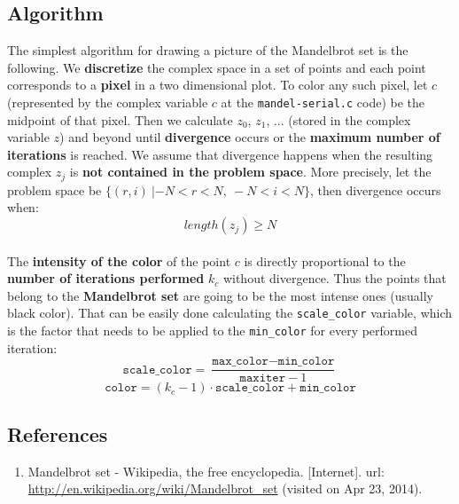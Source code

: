 \documentclass[a4paper,11pt]{article}
\begin{document}
\subsection{Algorithm}
The simplest algorithm for drawing a picture of the Mandelbrot set is the following. We \textbf{discretize} the
    complex space in a set of points and each point corresponds to a \textbf{pixel} in a two dimensional plot. To color
    any such pixel, let $c$ (represented by the complex variable $c$ at the \texttt{mandel-serial.c}
    code) be the midpoint of that pixel. Then we calculate $z_0$, $z_1$, ... (stored in the complex variable
    $z$) and beyond until \textbf{divergence} occurs or
    the \textbf{maximum number of iterations} is reached. We assume that divergence happens when the resulting complex
    $z_j$ is \textbf{not contained in the problem space}. More precisely, let the problem space be
    $\{ (r, i) \: | -\!N < r < N, \: -N < i < N \}$, then divergence occurs when:
\[
length(z_j) \geq N
\]
\\
The \textbf{intensity of the color} of the point $c$ is directly proportional to the \textbf{number of iterations performed}
    $k_c$ without divergence. Thus the points that belong to the \textbf{Mandelbrot set} are going to be the most intense ones
    (usually black color). That can be easily done calculating the \texttt{scale\_color} variable, which is the factor that needs
    to be applied to the \texttt{min\_color} for every performed iteration:
\[
\texttt{scale\_color}
=
\frac{\texttt{max\_color} - \texttt{min\_color}}{\texttt{maxiter} - 1}
\]
\[
\texttt{color}
=
(k_c - 1) \cdot \texttt{scale\_color} + \texttt{min\_color}
\]
\subsection{References}
\label{mandelbrot:references}
\begin{enumerate}
\item{Mandelbrot set - Wikipedia, the free encyclopedia. [Internet]. url:
    \url{http://en.wikipedia.org/wiki/Mandelbrot\_set} (visited on Apr 23, 2014).}
\end{enumerate}
\clearpage
\end{document}
